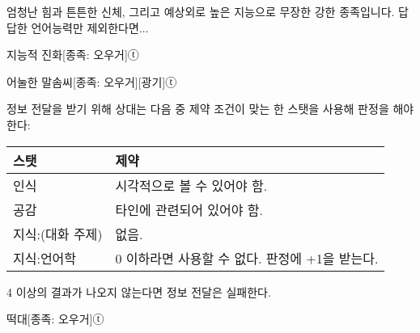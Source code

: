 \documentclass{report}
\begin{document}
	엄청난 힘과 튼튼한 신체, 그리고 예상외로 높은 지능으로 무장한 강한 종족입니다. 답답한 언어능력만 제외한다면...
	
	\begin{story}{지능적 진화}{[종족: 오우거]ⓣ}
		
	\end{story}
	
	\begin{story}{어눌한 말솜씨}{[종족: 오우거][광기]ⓣ}
		{정보 전달을 받기 위해 상대는 다음 중 제약 조건이 맞는 한 스탯을 사용해 판정을 해야한다:
		
		\begin{center}
			\begin{tabular}{l|l}
				\textbf{스탯}    & \textbf{제약}                                  \\\hline\hline
				인식             & 시각적으로 볼 수 있어야 함.                    \\\hline
				공감             & 타인에 관련되어 있어야 함.                     \\\hline
				지식:(대화 주제) & 없음.                                          \\\hline
				지식:언어학      & 0 이하라면 사용할 수 없다. 판정에 +1을 받는다.
			\end{tabular}
		\end{center}
		
		4 이상의 결과가 나오지 않는다면 정보 전달은 실패한다.}
		
		
	\end{story}
	
	\begin{story}{떡대}{[종족: 오우거]ⓣ}
		
		
		
	\end{story}
\end{document}
